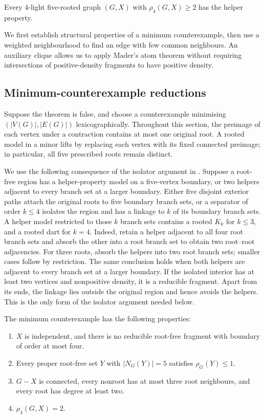 \begin{theorem}\label{thm:helper}
Every $4$-light five-rooted graph $(G,X)$ with $\rho_4(G,X)\ge2$ has
the helper property.
\end{theorem}

We first establish structural properties of a minimum counterexample,
then use a weighted neighbourhood to find an edge with few common
neighbours. An auxiliary clique allows us to apply Mader's atom theorem
without requiring intersections of positive-density fragments to have
positive density.

\subsection{Minimum-counterexample reductions}

Suppose the theorem is false, and choose a counterexample minimising
$(|V(G)|,|E(G)|)$ lexicographically. Throughout this section, the preimage
of each vertex under a contraction contains at most one original root.
A rooted model in a minor lifts by replacing each vertex with its fixed
connected preimage; in particular, all five prescribed roots remain
distinct.

We use the following consequence of the isolator argument in
\cite[Observation~4.1 and proof of Corollary~4.2]{DNR2026}. Suppose a
root-free region has a helper-property model on a five-vertex boundary,
or two helpers adjacent to every branch set at a larger boundary.
Either five disjoint exterior paths attach the original roots to five
boundary branch sets, or a separator of order $k\le4$ isolates the
region and has a linkage to $k$ of its boundary branch sets. A helper
model restricted to those $k$ branch sets contains a rooted $K_k$ for
$k\le3$, and a rooted dart for $k=4$. Indeed, retain a helper adjacent
to all four root branch sets and absorb the other into a root branch
set to obtain two root--root adjacencies. For three roots, absorb the
helpers into two root branch sets; smaller cases follow by restriction.
The same conclusion holds when both helpers are adjacent to every branch
set at a larger boundary. If the isolated interior has at least two
vertices and nonpositive density, it is a reducible fragment. Apart from
its ends, the linkage lies outside the original region and hence avoids
the helpers. This is the only form of the isolator argument needed below.

\begin{lemma}\label{rh:basic}
The minimum counterexample has the following properties:
\begin{enumerate}
\item $X$ is independent, and there is no reducible root-free fragment
with boundary of order at most four.
\item Every proper root-free set $Y$ with $|N_G(Y)|=5$ satisfies
$\rho_G(Y)\le1$.
\item $G-X$ is connected, every nonroot has at most three root neighbours,
and every root has degree at least two.
\item $\rho_4(G,X)=2$.
\end{enumerate}
\end{lemma}

